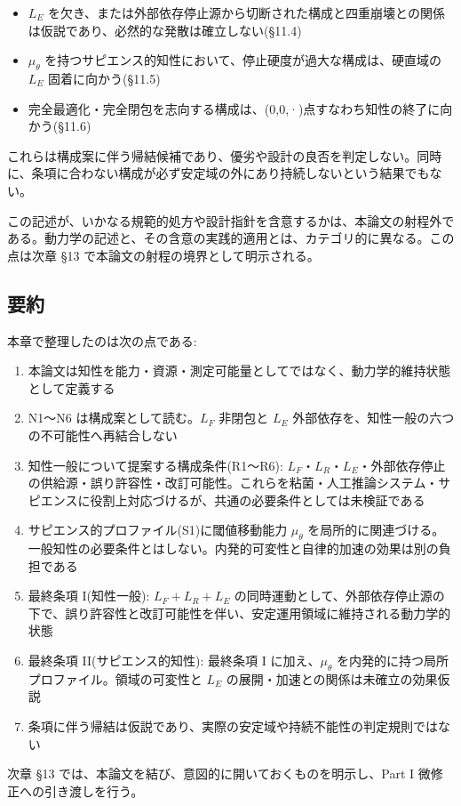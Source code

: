 \begin{itemize}
\item $L_E$ を欠き、または外部依存停止源から切断された構成と四重崩壊との関係は仮説であり、必然的な発散は確立しない(\S{}11.4)
\item $\mu_\theta$ を持つサピエンス的知性において、停止硬度が過大な構成は、硬直域の $L_E$ 固着に向かう(\S{}11.5)
\item 完全最適化・完全閉包を志向する構成は、(0,0,·)点すなわち知性の終了に向かう(\S{}11.6)
\end{itemize}


これらは構成案に伴う帰結候補であり、優劣や設計の良否を判定しない。同時に、条項に合わない構成が必ず安定域の外にあり持続しないという結果でもない。

この記述が、いかなる規範的処方や設計指針を含意するかは、本論文の射程外である。動力学の記述と、その含意の実践的適用とは、カテゴリ的に異なる。この点は次章 \S{}13 で本論文の射程の境界として明示される。

\bigskip


\subsection{要約}


本章で整理したのは次の点である:

\begin{enumerate}
\item 本論文は知性を能力・資源・測定可能量としてではなく、動力学的維持状態として定義する
\item N1〜N6 は構成案として読む。$L_F$ 非閉包と $L_E$ 外部依存を、知性一般の六つの不可能性へ再結合しない
\item 知性一般について提案する構成条件(R1〜R6): $L_F$・$L_R$・$L_E$・外部依存停止の供給源・誤り許容性・改訂可能性。これらを粘菌・人工推論システム・サピエンスに役割上対応づけるが、共通の必要条件としては未検証である
\item サピエンス的プロファイル(S1)に閾値移動能力 $\mu_\theta$ を局所的に関連づける。一般知性の必要条件とはしない。内発的可変性と自律的加速の効果は別の負担である
\item 最終条項 I(知性一般): $L_F + L_R + L_E$ の同時運動として、外部依存停止源の下で、誤り許容性と改訂可能性を伴い、安定運用領域に維持される動力学的状態
\item 最終条項 II(サピエンス的知性): 最終条項 I に加え、$\mu_\theta$ を内発的に持つ局所プロファイル。領域の可変性と $L_E$ の展開・加速との関係は未確立の効果仮説
\item 条項に伴う帰結は仮説であり、実際の安定域や持続不能性の判定規則ではない
\end{enumerate}


次章 \S{}13 では、本論文を結び、意図的に開いておくものを明示し、Part I 微修正への引き渡しを行う。

\bigskip
